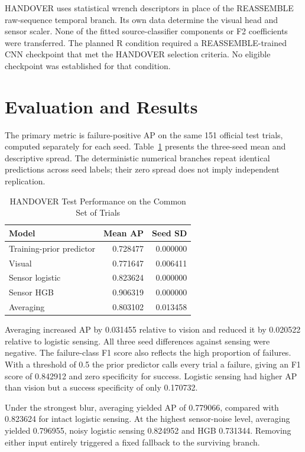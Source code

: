 HANDOVER uses statistical wrench descriptors in place of the REASSEMBLE raw-sequence
temporal branch. Its own data determine the visual head and sensor scaler. None of the
fitted source-classifier components or F2 coefficients were transferred. The planned R
condition required a REASSEMBLE-trained CNN checkpoint that met the HANDOVER selection
criteria. No eligible checkpoint was established for that condition.

\section{Evaluation and Results}
The primary metric is failure-positive AP on the same 151 official test trials, computed
separately for each seed. Table~\ref{tab:handover-clean} presents the three-seed mean
and descriptive spread. The deterministic numerical branches repeat identical
predictions across seed labels; their zero spread does not imply independent
replication.

\begin{table}[htbp]
\caption{HANDOVER Test Performance on the Common Set of Trials}\label{tab:handover-clean}
\centering\small

\begin{tabular}{lrr}\hline Model&Mean AP&Seed SD\\\hline
Training-prior predictor&0.728477&0.000000\\
Visual&0.771647&0.006411\\
Sensor logistic&0.823624&0.000000\\
Sensor HGB&0.906319&0.000000\\
Averaging&0.803102&0.013458\\\hline
\end{tabular}
\end{table}

Averaging increased AP by 0.031455 relative to vision and reduced it by 0.020522
relative to logistic sensing. All three seed differences against sensing were negative.
The failure-class F1 score also reflects the high proportion of failures. With a threshold of 0.5
the prior predictor calls every trial a failure, giving an F1 score of 0.842912 and zero
specificity for success. Logistic sensing had higher AP than vision but a success
specificity of only 0.170732.

Under the strongest blur, averaging yielded AP of 0.779066, compared with 0.823624 for
intact logistic sensing. At the highest sensor-noise level, averaging yielded 0.796955,
noisy logistic sensing 0.824952 and HGB 0.731344. Removing either input entirely
triggered a fixed fallback to the surviving branch.

